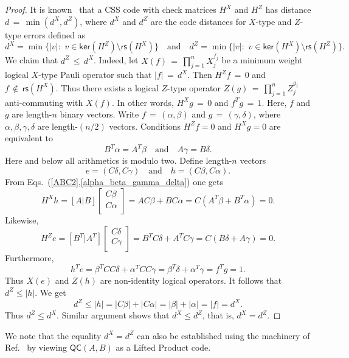 \documentclass{article}
\newcommand{\be}{\begin{equation}}
\newcommand{\ee}{\end{equation}}
\newcommand{\ba}{\begin{array}}
\newcommand{\ea}{\end{array}}
\newcommand{\rs}[1]{\mathsf{rs}{(#1)}}
\renewcommand{\ker}[1]{\mathsf{ker}{(#1)}}
\newcommand{\qc}{\mathsf{QC}(A,B)}
\begin{document}
\begin{proof}
It is known~\cite{steane1996multiple,calderbank1996good}  that 
a CSS code with check matrices $H^X$ and $H^Z$ has distance
$d\,{=}\,\min{(d^X,d^Z)}$, where 
$d^X$ and $d^Z$ are the code distances for $X$-type and $Z$-type errors
defined as
\[
d^X =  \min\bigl\{ |v|{:} \,\, v\in \ker{H^Z}{\setminus} \rs{H^X} \bigr\}
\quad \mbox{and} \quad
d^Z =  \min\bigl\{ |v|{:} \,\, v\in \ker{H^X}{\setminus} \rs{H^Z} \bigr\}.
\]
We claim that $d^Z\,{\le}\, d^X$.
Indeed, let $X(f)\,{=}\,\prod_{j=1}^n X_j^{f_j}$ be a minimum weight logical $X$-type Pauli operator
such that $|f|\,{=}\,d^X$. 
Then $H^Z f\,{=}\,0$ and $f\,{\notin}\, \rs{H^X}$.
Thus there exists a logical $Z$-type operator $Z(g)\,{=}\,\prod_{j=1}^n Z_j^{g_j}$ anti-commuting with $X(f)$. In other words, $H^X g\,{=}\,0$ and $f^T g \,{=}\, 1$. Here, $f$ and $g$ are length-$n$ binary vectors.
Write $f\,{=}\,(\alpha,\beta)$ and $g\,{=}\,(\gamma, \delta)$, where $\alpha,\beta,\gamma,\delta$ are length-$(n/2)$ vectors.
Conditions $H^Z f =0$ and $H^X g=0$ are equivalent to 
\be
\label{alpha_beta_gamma_delta}
B^T \alpha = A^T \beta \quad \mbox{and} \quad A \gamma = B \delta.
\ee
Here and below all arithmetics is modulo two.
Define length-$n$ vectors 
\be
e = (C\delta, C\gamma) \quad \mbox{and} \quad h=(C \beta, C\alpha).
\ee
From Eqs.~(\ref{ABC2},\ref{alpha_beta_gamma_delta}) one gets
\[
H^X h = [A|B]\left[\ba{c} C \beta \\ C \alpha\\ \ea\right]
=AC\beta+BC\alpha = C(A^T \beta + B^T \alpha) = 0.
\]
Likewise, 
\[
H^Z e = [B^T|A^T]\left[\ba{c} C \delta \\ C \gamma\\ \ea\right]
=B^T C\delta + A^T C\gamma = C(B \delta + A \gamma) = 0.
\]
Furthermore, 
\[
h^T e = \beta^T C C \delta + \alpha^T C C\gamma = \beta^T \delta + \alpha^T \gamma =f^T g=1.
\]
Thus $X(e)$ and $Z(h)$ are non-identity logical operators. 
It follows that $d^Z\le |h|$. We get
\[
d^Z\le |h|=|C\beta|+|C\alpha|=|\beta|+|\alpha|=|f|=d^X.
\]
Thus $d^Z\le d^X$. Similar argument shows that $d^X\le d^Z$, that is, $d^X=d^Z$.
\end{proof}
\noindent
We note that
the equality $d^X=d^Z$ can also be established using the machinery of
Ref.~\cite{panteleev2021quantum} 
by viewing $\qc$ as a Lifted Product code.
\end{document}
